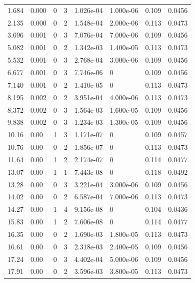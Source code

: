 \documentclass[preview]{standalone}
\begin{document}
{{\begin{tabular}{L{1.2cm}C{1.2cm} C{0.3cm}C{0.5cm} C{1.4cm}C{1.4cm} C{1.4cm}C{1.4cm}}
  1.684  &  0.000  & 0     &  3 &  1.026e-04  & 1.000e-06  & 0.109 &  0.0456   \\ 
  2.135  &  0.000  & 0     &  2 &  1.548e-04  & 2.000e-06  & 0.113 &  0.0473   \\ 
  3.696  &  0.001  & 0     &  3 &  7.076e-04  & 7.000e-06  & 0.109 &  0.0456   \\ 
  5.082  &  0.001  & 0     &  2 &  1.342e-03  & 1.400e-05  & 0.113 &  0.0473   \\ 
  5.532  &  0.001  & 0     &  3 &  2.768e-04  & 3.000e-06  & 0.109 &  0.0456   \\ 
  6.677  &  0.001  & 0     &  3 &  7.746e-06  & 0  & 0.109 &  0.0456   \\ 
  7.140  &  0.001  & 0     &  2 &  1.410e-05  & 0  & 0.113 &  0.0473   \\ 
  8.195  &  0.002  & 0     &  2 &  3.951e-04  & 4.000e-06  & 0.113 &  0.0473   \\ 
  8.372  &  0.002  & 0     &  3 &  1.564e-03  & 1.600e-05  & 0.109 &  0.0456   \\ 
  9.838  &  0.002  & 0     &  3 &  1.234e-03  & 1.300e-05  & 0.109 &  0.0456   \\ 
  10.16  &  0.00  & 1     &  3 &  1.171e-07  & 0  & 0.109 &  0.0457   \\ 
  10.76  &  0.00  & 0     &  2 &  1.856e-07  & 0  & 0.113 &  0.0473   \\ 
  11.64  &  0.00  & 1     &  2 &  2.174e-07  & 0  & 0.114 &  0.0477   \\ 
  13.07  &  0.00  & 1     &  1 &  7.443e-08  & 0  & 0.118 &  0.0492   \\ 
  13.28  &  0.00  & 0     &  3 &  3.221e-04  & 3.000e-06  & 0.109 &  0.0456   \\ 
  14.02  &  0.00  & 0     &  2 &  6.587e-04  & 7.000e-06  & 0.113 &  0.0473   \\ 
  14.27  &  0.00  & 1     &  4 &  9.156e-08  & 0  & 0.104 &  0.0436   \\ 
  15.83  &  0.00  & 1     &  2 &  7.606e-08  & 0  & 0.114 &  0.0477   \\ 
  16.35  &  0.00  & 0     &  2 &  1.690e-03  & 1.800e-05  & 0.113 &  0.0473   \\ 
  16.61  &  0.00  & 0     &  3 &  2.318e-03  & 2.400e-05  & 0.109 &  0.0456   \\ 
  17.24  &  0.00  & 0     &  3 &  4.402e-04  & 5.000e-06  & 0.109 &  0.0456   \\ 
  17.91  &  0.00  & 0     &  2 &  3.596e-03  & 3.800e-05  & 0.113 &  0.0473   \\ 

\end{tabular}}}
\end{document}
